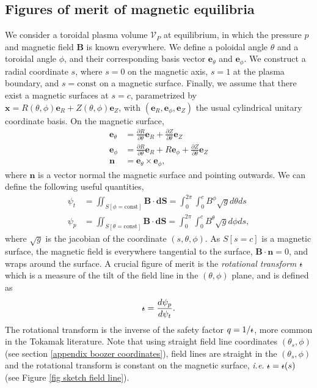 \documentclass[my_thesis.tex]{subfiles}
\begin{document}
\subsection{Figures of merit of magnetic equilibria}
We consider a toroidal plasma volume $\mathcal{V}_P$ at equilibrium, in which the pressure $p$ and magnetic field $\mathbf{B}$ is known everywhere. We define a poloidal angle $\theta$ and a toroidal angle $\phi$, and their corresponding basis vector $\mathbf{e}_\theta$ and $\mathbf{e}_\phi$. We construct a radial coordinate $s$, where $s=0$ on the magnetic axis, $s=1$ at the plasma boundary, and $s=\text{const}$ on a magnetic surface. Finally, we assume that there exist a magnetic surfaces at $s=c$, parametrized by $\mathbf{x}=R(\theta,\phi)\mathbf{e}_R + Z(\theta,\phi)\mathbf{e}_Z$, with $(\mathbf{e}_R,\mathbf{e}_\phi,\mathbf{e}_Z)$ the usual cylindrical unitary coordinate basis. On the magnetic surface, 
\begin{align}
	\mathbf{e}_\theta &= \frac{\partial R}{\partial \theta}\mathbf{e}_R + \frac{\partial Z}{\partial \theta}\mathbf{e}_Z\\
	\mathbf{e}_\phi &= \frac{\partial R}{\partial \theta}\mathbf{e}_R + R\mathbf{e}_\phi + \frac{\partial Z}{\partial \theta}\mathbf{e}_Z\\
	\mathbf{n} &= \mathbf{e}_\theta\times\mathbf{e}_\phi,
\end{align}
where $\mathbf{n}$ is a vector normal the magnetic surface and pointing outwards. We can define the following useful quantities,
\begin{align}
	\psi_t &= \iint_{S[\phi=\text{const}]} \mathbf{B}\cdot \mathbf{dS} = \int_0^{2\pi}\int_0^c B^\phi \sqrt{g}d\theta ds\\
	\psi_p &= \iint_{S[\theta=\text{const}]} \mathbf{B}\cdot \mathbf{dS} = \int_0^{2\pi}\int_0^c B^\theta \sqrt{g}d\phi ds,
\end{align}
where $\sqrt{g}$ is the jacobian of the coordinate $(s,\theta,\phi)$. As $S[s=c]$ is a magnetic surface, the magnetic field is everywhere tangential to the surface, $\mathbf{B}\cdot\mathbf{n}=0$, and wraps around the surface. A crucial figure of merit is the \emph{rotational transform} $\text{$\iota\!\!$-}$ which is a measure of the tilt of the field line in the $(\theta,\phi)$ plane, and is defined as
\begin{equation}
	\text{$\iota\!\!$-} = \frac{d\psi_p}{d\psi_t}.
\end{equation}
The rotational transform is the inverse of the safety factor $q=1/\text{$\iota\!\!$-}$, more common in the Tokamak literature. Note that using straight field line coordinates $(\theta_s,\phi)$ (see section \ref{appendix boozer coordinates}), field lines are straight in the $(\theta_s,\phi)$ and the rotational transform is constant on the magnetic surface, \textit{i.e.} $\text{$\iota\!\!$-}=\text{$\iota\!\!$-}(s)$ (see Figure \ref{fig sketch field line}).
\end{document}
